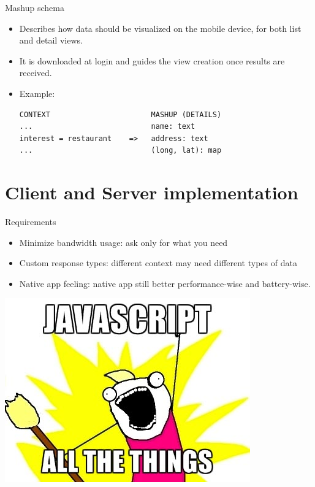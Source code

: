 \documentclass[smaller]{beamer}
\begin{document}
\begin{frame}[fragile,label={sec:orgheadline16}]{Mashup schema}
 \begin{itemize}
\item Describes how data should be visualized on the mobile device, for both \alert{list}
  and \alert{detail} views.

\item It is downloaded at login and guides the view creation once results are
received.

\item Example:

\begin{verbatim}
CONTEXT                       MASHUP (DETAILS)
...                           name: text
interest = restaurant    =>   address: text
...                           (long, lat): map
\end{verbatim}
\end{itemize}
\end{frame}

\section{Client and Server implementation}
\label{sec:orgheadline24}
\begin{frame}[label={sec:orgheadline18}]{Requirements}
\begin{itemize}
\item \alert{Minimize bandwidth usage}: ask only for what you need

\item \alert{Custom response types}: different context may need different types of data

\item \alert{Native app feeling}: native app still better performance-wise and battery-wise.
\end{itemize}
\end{frame}

\begin{frame}[label={sec:orgheadline19}]{}
\includegraphics{./images/jsatt.jpg} 
\end{frame}
\end{document}
